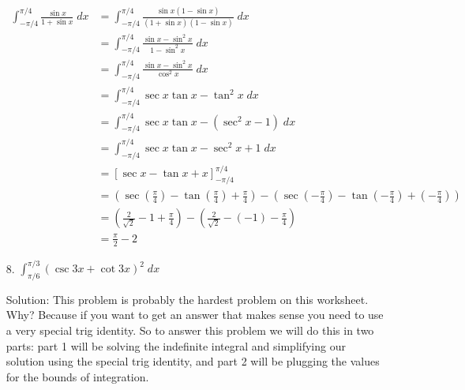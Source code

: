 \documentclass[11pt,reqno]{article}
\theoremstyle{definition}
\begin{document}
\begin{enumerate}
	\begin{align*}
		\int_{-\pi/4}^{\pi/4} \frac{\sin x}{1 + \sin x} \; dx &= \int_{-\pi/4}^{\pi/4} \frac{\sin x(1 - \sin x)}{(1 + \sin x) (1 - \sin x)} \; dx \\ 
															  &= \int_{-\pi/4}^{\pi/4} \frac{\sin x - \sin^2 x}{1 - \sin^2 x} \; dx \\
															  &= \int_{-\pi/4}^{\pi/4} \frac{\sin x - \sin^2 x}{\cos^2 x} \; dx \\
															  &= \int_{-\pi/4}^{\pi/4} \sec x \tan x - \tan^2 x \; dx \\
															  &= \int_{-\pi/4}^{\pi/4} \sec x \tan x - (\sec^2 x - 1) \;dx \\ 
															  &= \int_{-\pi/4}^{\pi/4} \sec x \tan x - \sec^2 x + 1 \; dx \\
															  &= \left[\sec x - \tan x + x\right]_{-\pi/4}^{\pi/4} \\
															  &= \left( \sec \left(\frac{\pi}{4}\right) - \tan \left(\frac{\pi}{4}\right) + \frac{\pi}{4}\right) - \left( \sec \left(-\frac{\pi}{4}\right) - \tan \left(-\frac{\pi}{4}\right) + \left(-\frac{\pi}{4}\right)\right) \\
															  &= \left(\frac{2}{\sqrt{2}} - 1 + \frac{\pi}{4}\right) - \left(\frac{2}{\sqrt{2}} - (-1) - \frac{\pi}{4}\right) \\
															  &=\frac{\pi}{2} - 2
	\end{align*}
	\newpage
	\item[8.] $\int_{\pi/6}^{\pi/3} (\csc 3x + \cot 3x)^2 \; dx$
	
	Solution: This problem is probably the hardest problem on this worksheet. Why? Because if you want to get an answer that makes sense you need to use a very special trig identity. So to answer this problem we will do this in two parts: part 1 will be solving the indefinite integral and simplifying our solution using the special trig identity, and part 2 will be plugging the values for the bounds of integration. 
	

\end{enumerate}
\end{document}
